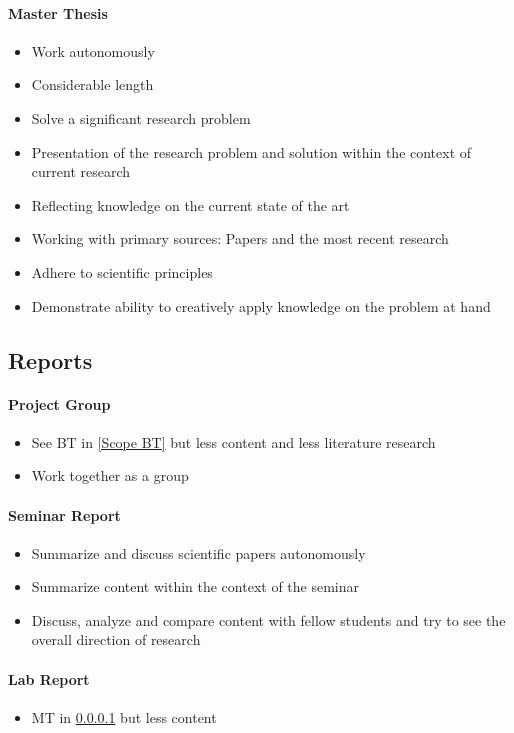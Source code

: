 \documentclass[nodate]{proc}
\begin{document}
\paragraph{Master Thesis} \label{Scope MT}
\begin{itemize}
	\item Work autonomously
	\item Considerable length
	\item Solve a significant research problem
	\item Presentation of the research problem and solution within the context of current research
	\item Reflecting knowledge on the current state of the art
	\item Working with primary sources: Papers and the most recent research
	\item Adhere to scientific principles
	\item Demonstrate ability to creatively apply knowledge on the problem at hand
\end{itemize}

\subsection{Reports}

\paragraph{Project Group}
	\begin{itemize}
		\item See BT in \ref{Scope BT} but less content and less literature research
		\item Work together as a group
	\end{itemize}
\paragraph{Seminar Report}
	\begin{itemize}
		\item Summarize and discuss scientific papers autonomously
		\item Summarize content within the context of the seminar
		\item Discuss, analyze and compare content with fellow students and try to see the overall direction of research
	\end{itemize}
\paragraph{Lab Report}
	\begin{itemize}
		\item  MT in \ref{Scope MT} but less content
	\end{itemize}


\printbibliography
\end{document}

